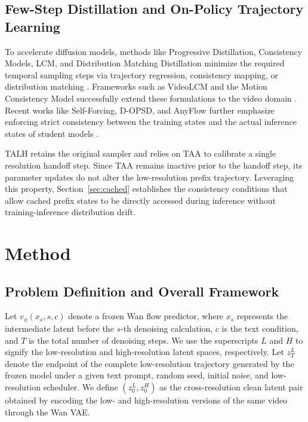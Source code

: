 \subsection{Few-Step Distillation and On-Policy Trajectory Learning}

To accelerate diffusion models, methods like Progressive Distillation,
Consistency Models, LCM, and Distribution Matching Distillation minimize
the required temporal sampling steps via trajectory regression,
consistency mapping, or distribution matching
\citep{salimans2022progressive, song2023consistency, luo2023lcm, yin2024dmd, yin2024dmd2}.
Frameworks such as VideoLCM and the Motion Consistency Model
successfully extend these formulations to the video domain
\citep{wang2023videolcm, zhai2024mcm}. Recent works like Self-Forcing,
D-OPSD, and AnyFlow further emphasize enforcing strict consistency
between the training states and the actual inference states of student
models \citep{huang2025selfforcing, jiang2026dopsd, gu2026anyflow}.

TALH retains the original sampler and relies on TAA to calibrate a
single resolution handoff step. Since TAA remains inactive prior to the
handoff step, its parameter updates do not alter the low-resolution
prefix trajectory. Leveraging this property, Section~\ref{sec:cached} establishes the
consistency conditions that allow cached prefix states to be directly
accessed during inference without training-inference distribution drift.

\section{Method}

\subsection{Problem Definition and Overall Framework}

Let \(v_\phi(x_s, s, c)\) denote a frozen Wan flow predictor, where
\(x_s\) represents the intermediate latent before the \(s\)-th denoising
calculation, \(c\) is the text condition, and \(T\) is the total number
of denoising steps. We use the superscripts \(L\) and \(H\) to signify
the low-resolution and high-resolution latent spaces, respectively. Let
\(z_T^L\) denote the endpoint of the complete low-resolution trajectory
generated by the frozen model under a given text prompt, random seed,
initial noise, and low-resolution scheduler. We define
\((z_0^L, z_0^H)\) as the cross-resolution clean latent pair obtained by
encoding the low- and high-resolution versions of the same video through
the Wan VAE.

